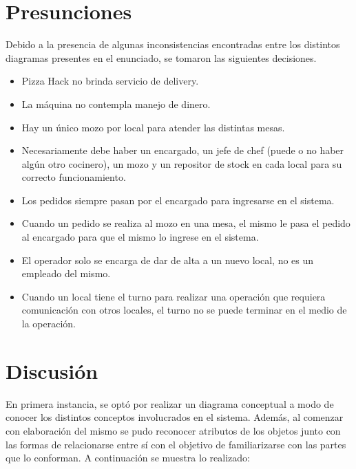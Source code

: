 \documentclass[a4paper,11pt] {article}
\begin{document}
\section*{Presunciones}

Debido a la presencia de algunas inconsistencias encontradas entre los distintos diagramas presentes en el enunciado, se tomaron las siguientes decisiones.

\begin{itemize}
    \item Pizza Hack no brinda servicio de delivery.
    \item La m\'aquina no contempla manejo de dinero.
    \item Hay un \'unico mozo por local para atender las distintas mesas.
    \item Necesariamente debe haber un encargado, un jefe de chef (puede o no haber alg\'un otro cocinero), un mozo y un repositor de stock en cada local para su correcto funcionamiento.
    \item Los pedidos siempre pasan por el encargado para ingresarse en el sistema.
    \item Cuando un pedido se realiza al mozo en una mesa, el mismo le pasa el pedido al encargado para que el mismo lo ingrese en el sistema.
    \item El operador solo se encarga de dar de alta a un nuevo local, no es un empleado del mismo.
		\item Cuando un local tiene el turno para realizar una operaci\'on que requiera comunicaci\'on con otros locales, el turno no se puede terminar en el medio de la operaci\'on.
\end{itemize}

\section*{Discusi\'on}

En primera instancia, se opt\'o por realizar un diagrama conceptual a modo de conocer los distintos conceptos involucrados en el sistema. Adem\'as, al comenzar con elaboraci\'on del mismo se pudo reconocer atributos de los objetos junto con las formas de relacionarse entre s\'i con el objetivo de familiarizarse con las partes que lo conforman. A continuaci\'on se muestra lo realizado:
\end{document}
